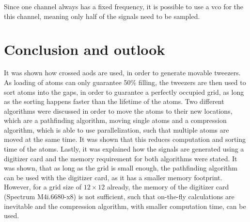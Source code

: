 Since one channel always has a fixed frequency, it is possible to use a \ac{vco} for the this channel, meaning only half of the signals need to be sampled.

\section{Conclusion and outlook}

It was shown how crossed \acp{aod} are used, in order to generate movable tweezers. As loading of atoms can only guarantee 50\% filling, the tweezers are then used to sort atoms into the gaps, in order to guarantee a perfectly occupied grid, as long as the sorting happens faster than the lifetime of the atoms. Two different algorithms were discussed in order to move the atoms to their new locations, which are a pathfinding algorithm, moving single atoms and a compression algorithm, which is able to use parallelization, such that multiple atoms are moved at the same time. It was shown that this reduces computation and sorting time of the atoms. Lastly, it was explained how the signals are generated using a digitizer card and the memory requirement for both algorithms were stated. It was shown, that as long as the grid is small enough, the pathfinding algorithm can be used with the digitizer card, as it has a smaller memory footprint. However, for a grid size of $12\times12$ already, the memory of the digitizer card (Spectrum M4i.6680-x8) is not sufficient, such that on-the-fly calculations are inevitable and the compression algorithm, with smaller computation time, can be used.
